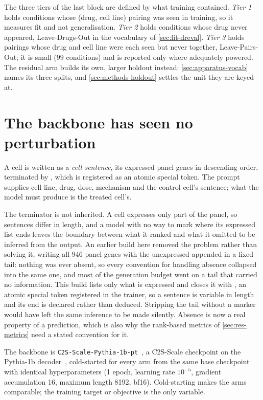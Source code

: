 The three tiers of the last block are defined by what training contained.
\emph{Tier 1} holds conditions whose (drug, cell line) pairing was
seen in training, so it measures fit and not generalisation. \emph{Tier 2} holds
conditions whose drug never appeared, Leave-Drugs-Out in the vocabulary of
\cref{sec:lit-dreval}. \emph{Tier 3} holds pairings whose drug and cell line
were each seen but never together, Leave-Pairs-Out; it is small ($99$
conditions) and is reported only where adequately powered. The residual arm
builds its own, larger holdout instead: \cref{sec:apparatus-vocab} names its
three splits, and \cref{sec:methods-holdout} settles the unit they are keyed
at.

\section{The backbone has seen no perturbation}

A cell is written as a \emph{cell sentence}, its expressed panel genes in
descending order, terminated by \ENDCELL{}, which is registered as an atomic
special token. The prompt supplies cell line, drug, dose, mechanism and the
control cell's sentence; what the model must produce is the treated cell's. 

The terminator is not inherited. A cell expresses only part of the panel, so
sentences differ in length, and a model with no way to mark where its expressed
list ends leaves the boundary between what it ranked and what it omitted to be
inferred from the output. An earlier build here removed the problem rather than
solving it, writing all $946$ panel genes with the unexpressed appended in a
fixed tail: nothing was ever absent, so every convention for handling absence
collapsed into the same one, and most of the generation budget went on a tail
that carried no information. This build lists only what is expressed and closes
it with \ENDCELL{}, an atomic special token registered in the trainer, so a
sentence is variable in length and its end is declared rather than deduced.
Stripping the tail without a marker would have left the same inference to be made
silently. Absence is now a real property of a prediction, which is also why the
rank-based metrics of \cref{sec:res-metrics} need a stated convention for it.

The backbone is \texttt{C2S-Scale-Pythia-1b-pt}~\cite{c2sscale}, a C2S-Scale
checkpoint on the Pythia-1b decoder~\cite{pythia}, cold-started for every arm
from the same base checkpoint with identical hyperparameters (1 epoch, learning
rate $10^{-5}$, gradient accumulation 16, maximum length 8192,
bf16). Cold-starting
makes the arms comparable; the training target or objective is the only
variable.

